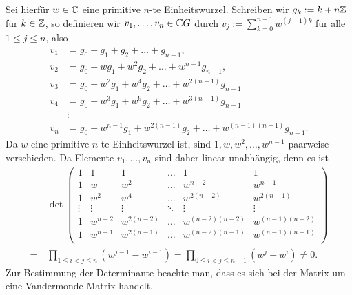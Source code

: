 \documentclass[a4paper,10pt]{article}
\begin{document}
Sei hierfür $w \in \mathbb{C}$ eine primitive $n$-te Einheitswurzel. Schreiben wir $g_k := k + n\mathbb{Z}$ für $k \in \mathbb{Z}$, so definieren wir $v_1, \ldots, v_n \in \mathbb{C} G$ durch $v_j := \sum_{k=0}^{n-1} w^{(j-1)k}$ für alle $1 \leq j \leq n$, also
\begin{align*}
 v_1 &= g_0 + g_1 + g_2 + \ldots + g_{n-1}, \\
 v_2 &= g_0 + w g_1 + w^2 g_2 + \ldots + w^{n-1} g_{n-1}, \\
 v_3 &= g_0 + w^2 g_1 + w^4 g_2 + \ldots + w^{2(n-1)} g_{n-1} \\
 v_4 &= g_0 + w^3 g_1 + w^9 g_2 + \ldots + w^{3(n-1)} g_{n-1} \\
     &\vdots \\
 v_n &= g_0 + w^{n-1} g_1 + w^{2(n-1)} g_2 + \ldots + w^{(n-1)(n-1)} g_{n-1}.
\end{align*}
Da $w$ eine primitive $n$-te Einheitswurzel ist, sind $1, w, w^2, \ldots, w^{n-1}$ paarweise verschieden. Da Elemente $v_1, \ldots, v_n$ sind daher linear unabhängig, denn es ist
\begin{align*}
 &\, \det
 \begin{pmatrix}
       1 &       1 &          1 & \hdots &              1 &          1     \\
       1 &       w &        w^2 & \hdots &        w^{n-2} &    w^{n-1}     \\
       1 &     w^2 &        w^4 & \hdots &     w^{2(n-2)} & w^{2(n-1)}     \\
  \vdots &  \vdots &     \vdots & \ddots &         \vdots &      \vdots    \\
       1 & w^{n-2} & w^{2(n-2)} & \hdots & w^{(n-2)(n-2)} & w^{(n-1)(n-2)} \\
       1 & w^{n-1} & w^{2(n-1)} & \hdots & w^{(n-2)(n-1)} & w^{(n-1)(n-1)} \\
 \end{pmatrix} \\
 =&\, \prod_{1 \leq i < j \leq n} (w^{j-1} - w^{i-1})
 = \prod_{0 \leq i < j \leq n-1} (w^j - w^i)
 \neq 0.
\end{align*}
Zur Bestimmung der Determinante beachte man, dass es sich bei der Matrix um eine Vandermonde-Matrix handelt.
\end{document}
